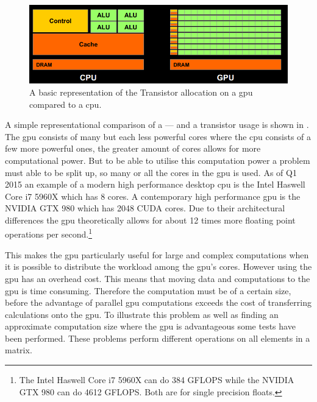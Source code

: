 \begin{figure}[h!]
\centering
 \includegraphics[width=1\textwidth]{figures/GPUCPUimage.png} %
\caption{A basic representation of the Transistor allocation on a \acrshort{gpu} compared to a \acrshort{cpu}. \citep{NvidiaCUDASeminar}}\label{image:gpucpuimage}
\vspace{-15pt}
\end{figure}

A simple representational comparison of a  --- and a  transistor usage is shown in .
The \acrshort{gpu} consists of many but each less powerful cores where the \acrshort{cpu} consists of a few more powerful ones, the greater amount of cores allows for more computational power.
But to be able to utilise this computation power a problem must able to be split up, so many or all the cores in the \acrshort{gpu} is used.
As of Q1 2015 an example of a modern high performance desktop \acrshort{cpu} is the Intel Haswell Core i7 5960X which has 8 cores. \citep{puget}
A contemporary high performance \acrshort{gpu} is the NVIDIA GTX 980 which has 2048 CUDA cores. \citep{techpowerup,gtx980}
Due to their architectural differences the \acrshort{gpu} theoretically allows for about 12 times more floating point operations per second.\footnote{The Intel Haswell Core i7 5960X can do 384 GFLOPS while the  NVIDIA GTX 980 can do 4612 GFLOPS. Both are for single precision floats.}

This makes the \acrshort{gpu} particularly useful for large and complex computations when it is possible to distribute the workload among the \acrshort{gpu}'s cores.
However using the \acrshort{gpu} has an overhead cost. 
This means that moving data and computations to the \acrshort{gpu} is time consuming.
Therefore the computation must be of a certain size, before the advantage of parallel \acrshort{gpu} computations exceeds the cost of transferring calculations onto the \acrshort{gpu}.
To illustrate this problem as well as finding an approximate computation size where the \acrshort{gpu} is advantageous some tests have been performed.
These problems perform different operations on all elements in a matrix. 

